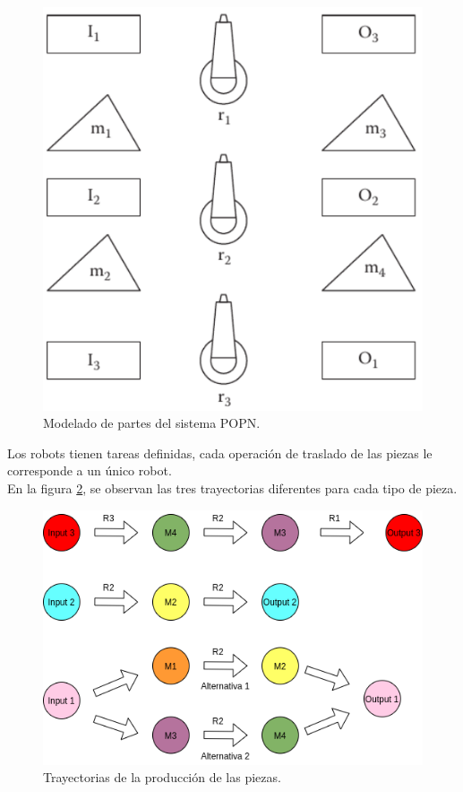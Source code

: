 \begin{figure}[H]
	\centering
	\includegraphics[scale=0.55]{Figures/algoritmo3/POPNrobot.png}
	\caption[Modelado de partes del sistema POPN.]{Modelado de partes del sistema POPN\footnotemark .}
	\label{fig:popnrobot}
 \end{figure} 

Los robots tienen tareas definidas, cada operación de traslado de las piezas le corresponde a un único robot. \\
En la figura \ref{fig:popnrobotlinea}, se observan las tres trayectorias diferentes para cada tipo de pieza.

\begin{figure}[H]
	\centering
	\includegraphics[scale=0.55]{Figures/algoritmo3/POPNrobotlinea.png}
	\caption{Trayectorias de la producción de las piezas.}
	\label{fig:popnrobotlinea}
 \end{figure} 

